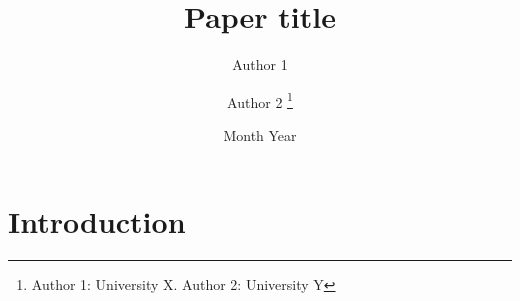 \documentclass[letterpaper,11pt,leqno]{article}
\begin{document}
\title{Paper title}

\author{Author 1
\and Author 2
%
\thanks{Author 1: University X. Author 2: University Y}}

\date{Month Year}   


\begin{titlepage}
\maketitle


\end{titlepage}


\section{Introduction}









\end{document}
